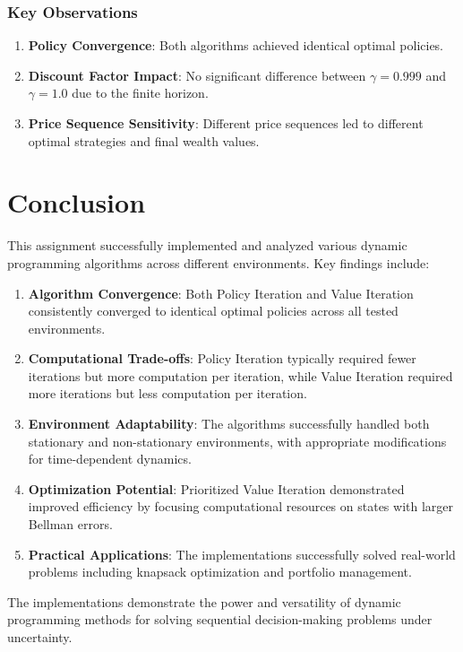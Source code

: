 \documentclass[12pt]{article}
\begin{document}
\subsubsection{Key Observations}

\begin{enumerate}
    \item \textbf{Policy Convergence}: Both algorithms achieved identical optimal policies.
    
    \item \textbf{Discount Factor Impact}: No significant difference between $\gamma = 0.999$ and $\gamma = 1.0$ due to the finite horizon.
    
    \item \textbf{Price Sequence Sensitivity}: Different price sequences led to different optimal strategies and final wealth values.
\end{enumerate}

\section{Conclusion}

This assignment successfully implemented and analyzed various dynamic programming algorithms across different environments. Key findings include:

\begin{enumerate}
    \item \textbf{Algorithm Convergence}: Both Policy Iteration and Value Iteration consistently converged to identical optimal policies across all tested environments.
    
    \item \textbf{Computational Trade-offs}: Policy Iteration typically required fewer iterations but more computation per iteration, while Value Iteration required more iterations but less computation per iteration.
    
    \item \textbf{Environment Adaptability}: The algorithms successfully handled both stationary and non-stationary environments, with appropriate modifications for time-dependent dynamics.
    
    \item \textbf{Optimization Potential}: Prioritized Value Iteration demonstrated improved efficiency by focusing computational resources on states with larger Bellman errors.
    
    \item \textbf{Practical Applications}: The implementations successfully solved real-world problems including knapsack optimization and portfolio management.
\end{enumerate}

The implementations demonstrate the power and versatility of dynamic programming methods for solving sequential decision-making problems under uncertainty.
\end{document}
